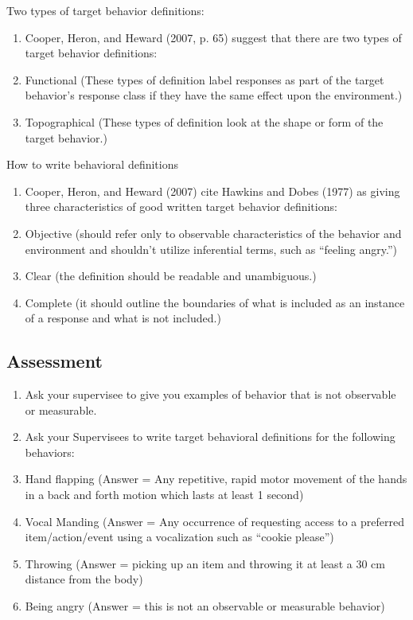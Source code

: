 Two types of target behavior definitions:\\
\begin{enumerate}
\item Cooper, Heron, and Heward (2007, p. 65) suggest that there are two types of target behavior definitions:
\item Functional (These types of definition label responses as part of the target behavior's response class if they have the same effect upon the environment.)
\item Topographical (These types of definition look at the shape or form of the target behavior.)
\end{enumerate}

How to write behavioral definitions
\begin{enumerate}
\item Cooper, Heron, and Heward (2007) cite Hawkins and Dobes (1977) as giving three characteristics of good written target behavior definitions:
\item Objective (should refer only to observable characteristics of the behavior and environment and shouldn't utilize inferential terms, such as ``feeling angry.'')
\item Clear (the definition should be readable and unambiguous.)
\item Complete (it should outline the boundaries of what is included as an instance of a response and what is not included.)
\end{enumerate}
%
\subsection{Assessment}
\begin{enumerate}
\item Ask your supervisee to give you examples of behavior that is not observable or measurable.
\item Ask your Supervisees to write target behavioral definitions for the following behaviors:
\item Hand flapping (Answer = Any repetitive, rapid motor movement of the hands in a back and forth motion which lasts at least 1 second) 
\item Vocal Manding (Answer = Any occurrence of requesting access to a preferred item/action/event using a vocalization such as ``cookie please'')
\item Throwing (Answer = picking up an item and throwing it at least a 30 cm distance from the body) 
\item Being angry (Answer = this is not an observable or measurable behavior)
%
\end{enumerate}
%
